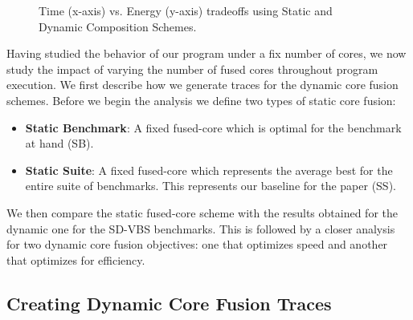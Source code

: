 \begin{figure}[t]
     \caption{Time (x-axis) vs. Energy (y-axis) tradeoffs using Static and Dynamic Composition Schemes.}
     \label{fig:paretos}
\vspace{5mm}
\end{figure}

Having studied the behavior of our program under a fix number of cores, we now study the impact of varying the number of fused cores throughout program execution.
We first describe how we generate traces for the dynamic core fusion schemes.
Before we begin the analysis we define two types of static core fusion:
\begin{itemize}
	\item \textbf{Static Benchmark}: A fixed fused-core which is optimal for the benchmark at hand (SB).
	\item \textbf{Static Suite}: A fixed fused-core which represents the average best for the entire suite of benchmarks. This represents our baseline for the paper (SS).
\end{itemize}
We then compare the static fused-core scheme with the results obtained for the dynamic one for the SD-VBS benchmarks.
This is followed by a closer analysis for two dynamic core fusion objectives: one that optimizes speed and another that optimizes for efficiency.

\subsection{Creating Dynamic Core Fusion Traces}

